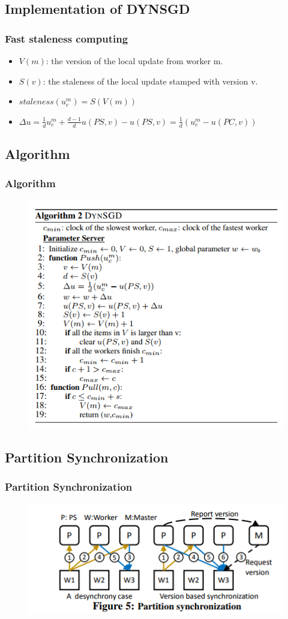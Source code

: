 \subsection{Implementation of DYNSGD}
\begin{frame}
    \frametitle{Fast staleness computing}
	\begin{itemize}
		\item $V(m)$: the version of the local update from worker m.
		\item $S(v)$: the staleness of the local update stamped with version v.
		\item $staleness(u_{c}^{m}) = S(V(m))$
		\item $\Delta u = \frac{1}{d}u_{c}^{m}+\frac{d-1}{d}u(PS,v)-u(PS,v)=\frac{1}{d}(u_{c}^{m}-u(PC,v))$
	\end{itemize} 
\end{frame}




\subsection{Algorithm}
\begin{frame}
    \frametitle{Algorithm}
	\begin{figure}
		\includegraphics[scale=0.5]{figure/dynsgd.png}
	\end{figure} 
\end{frame}

\subsection{Partition Synchronization}
\begin{frame}
    \frametitle{Partition Synchronization}
	\begin{figure}
		\includegraphics[scale=0.8]{figure/partitionsyn.png}
	\end{figure} 
\end{frame}



